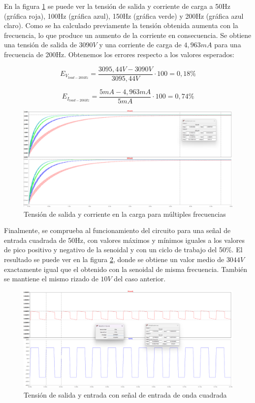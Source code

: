 En la figura \ref{200hz} se puede ver la tensión de salida y corriente de carga a 50Hz (gráfica roja), 100Hz (gráfica azul), 150Hz (gráfica verde)
y 200Hz (gráfica azul claro). Como se ha calculado previamente la tensión obtenida aumenta con la frecuencia, lo que produce un aumento de la corriente en consecuencia.
Se obtiene una tensión de salida de $3090V$ y una corriente de carga de $4,963mA$ para una frecuencia de 200Hz. Obtenemos los errores respecto a los valores esperados:

\begin{equation}
    E_{V_{load-200Hz}} = \frac{3095,44V - 3090V}{3095,44V} \cdot 100 = 0,18\%
\end{equation}

\begin{equation}
    E_{I_{load-200Hz}} = \frac{5mA - 4,963mA}{5mA} \cdot 100 = 0,74\%
\end{equation}

\begin{figure}[H]
    \centering
    \includegraphics[width=1\textwidth]{Imagenes_alvaro/200hz.png}
    \caption{Tensión de salida y corriente en la carga para múltiples frecuencias}
    \label{200hz}
\end{figure}

Finalmente, se comprueba al funcionamiento del circuito para una señal de entrada cuadrada de 50Hz, con valores máximos y mínimos iguales a los valores
de pico positivo y negativo de la senoidal y con un ciclo de trabajo del 50\%. El resultado se puede ver en la figura \ref{cuadrada}, donde se obtiene
un valor medio de $3044V$ exactamente igual que el obtenido con la senoidal de misma frecuencia. También se mantiene el mismo rizado de $10V$ del caso anterior.

\begin{figure}[H]
    \centering
    \includegraphics[width=1\textwidth]{Imagenes_alvaro/cuadrada.png}
    \caption{Tensión de salida y entrada con señal de entrada de onda cuadrada}
    \label{cuadrada}
\end{figure}

